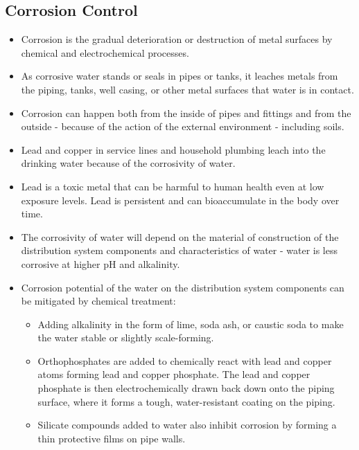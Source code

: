 \subsection{Corrosion Control}
\begin{itemize}
\item Corrosion is the gradual deterioration or destruction of metal surfaces by chemical and electrochemical processes.
\item As corrosive water stands or seals in pipes or tanks, it leaches metals from the piping, tanks, well casing, or other metal surfaces that water is in contact.
\item Corrosion can happen both from the inside of pipes and fittings and from the outside - because of the action of the external environment - including soils.
\item Lead and copper in service lines and household plumbing leach into the drinking water because of the corrosivity of water. 
\item Lead is a toxic metal that can be harmful to human health even at low exposure levels. Lead is persistent and can bioaccumulate in the body over time. 
\item The corrosivity of water will depend on the material of construction of the distribution system components and characteristics of water - water is less corrosive at higher pH and alkalinity.
\item Corrosion potential of the water on the distribution system components can be mitigated by chemical treatment:
\begin{itemize}
\item Adding alkalinity in the form of lime, soda ash, or caustic soda to make the water stable or slightly scale-forming. 
\item Orthophosphates are added to chemically react with lead and copper atoms forming lead and copper phosphate. The lead and copper phosphate is then electrochemically drawn back down onto the piping surface, where it forms a tough, water-resistant coating on the piping. 
\item Silicate compounds added to water also inhibit corrosion by forming a thin protective films on pipe walls.
\end{itemize}
\end{itemize}

